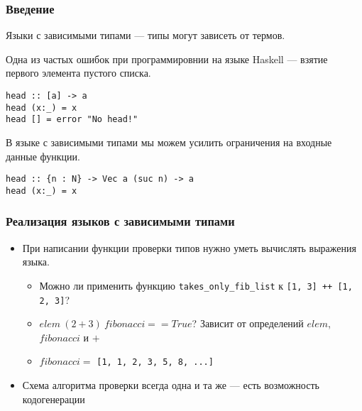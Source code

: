 
\begin{frame}[fragile]
\frametitle{Введение}

Языки с зависимыми типами --- типы могут зависеть от термов.

Одна из частых ошибок при программировнии на языке Haskell --- взятие первого элемента пустого списка.

\begin{verbatim}
head :: [a] -> a
head (x:_) = x
head [] = error "No head!"
\end{verbatim}

В языке с зависимыми типами мы можем усилить ограничения на входные данные функции.

\begin{verbatim}
head :: {n : N} -> Vec a (suc n) -> a
head (x:_) = x
\end{verbatim}

\end{frame}

\begin{frame}
\frametitle{Реализация языков с зависимыми типами}

\begin{itemize}
\item При написании функции проверки типов нужно уметь вычислять выражения языка.
  \begin{itemize}
    \item Можно ли применить функцию \lstinline{takes_only_fib_list} к \lstinline{[1, 3] ++ [1, 2, 3]}?
    \item $elem\ (2 + 3)\ fibonacci == True$? Зависит от определений $elem$, $fibonacci$ и $+$
    \item $fibonacci =$ \lstinline{[1, 1, 2, 3, 5, 8, ...]}
  \end{itemize}
\item Схема алгоритма проверки всегда одна и та же --- есть возможность кодогенерации

\end{itemize}

\end{frame}

